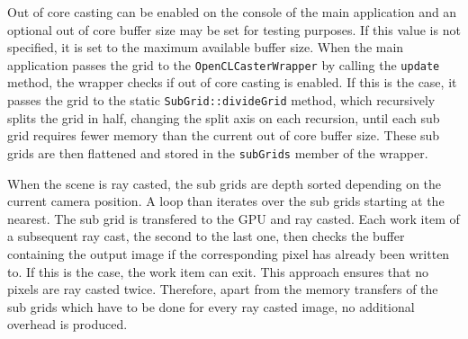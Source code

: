 Out of core casting can be enabled on the console of the main application and an optional out of core buffer size may be set for testing purposes. If this value is not specified, it is set to the maximum available buffer size. When the main application passes the grid to the \lstinline!OpenCLCasterWrapper! by calling the \lstinline!update! method, the wrapper checks if out of core casting is enabled. If this is the case, it passes the grid to the static \lstinline!SubGrid::divideGrid! method, which recursively splits the grid in half, changing the split axis on each recursion, until each sub grid requires fewer memory than the current out of core buffer size. These sub grids are then flattened and stored in the \lstinline!subGrids! member of the wrapper.

When the scene is ray casted, the sub grids are depth sorted depending on the current camera position. A loop than iterates over the sub grids starting at the nearest. The sub grid is transfered to the GPU and ray casted. Each work item of a subsequent ray cast, the second to the last one, then checks the buffer containing the output image if the corresponding pixel has already been written to. If this is the case, the work item can exit. This approach ensures that no pixels are ray casted twice. Therefore, apart from the memory transfers of the sub grids which have to be done for every ray casted image, no additional overhead is produced. 
